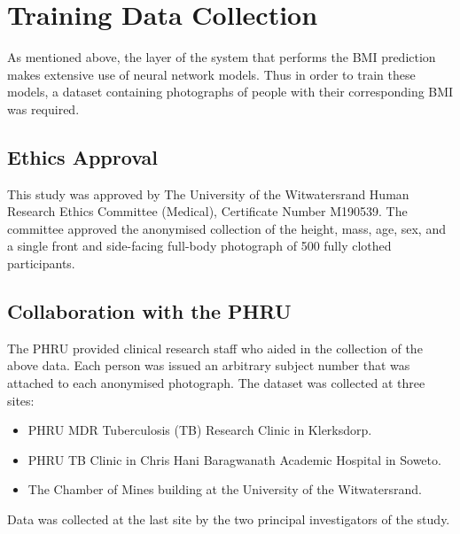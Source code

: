 \documentclass[conference]{IEEEtran}
\begin{document}
\section{Training Data Collection}
As mentioned above, the layer of the system that performs the BMI prediction makes extensive use of neural network models.
Thus in order to train these models, a dataset containing photographs of people with their corresponding BMI was required.
\subsection{Ethics Approval}
This study was approved by The University of the Witwatersrand Human Research Ethics Committee (Medical), Certificate Number M190539.
The committee approved the anonymised collection of the height, mass, age, sex, and a single front and side-facing full-body photograph of 500 fully clothed participants.
\subsection{Collaboration with the PHRU}
The PHRU provided clinical research staff who aided in the collection of the above data.
Each person was issued an arbitrary subject number that was attached to each anonymised photograph.
The dataset was collected at three sites:
\begin{itemize}
	\item PHRU MDR Tuberculosis (TB) Research Clinic in Klerksdorp.
	\item PHRU TB Clinic in Chris Hani Baragwanath Academic Hospital in Soweto.
	\item The Chamber of Mines building at the University of the Witwatersrand.
\end{itemize}
Data was collected at the last site by the two principal investigators of the study.
\end{document}
